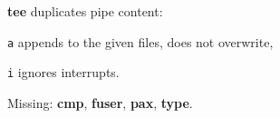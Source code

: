 \begin{enumx}
	\item [\cmdblack] \textbf{tee} duplicates pipe content: %
	\item [\texttt{a}] appends to the given files, does not overwrite,
	\item [\texttt{i}] ignores interrupts.
\end{enumx}

\begin{enumx}
	\item [\cmd] Missing: \textbf{cmp}, \textbf{fuser}, \textbf{pax}, \textbf{type}.
\end{enumx}
